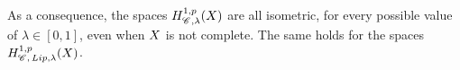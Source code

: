 \documentclass[12pt]{amsart}
\newcommand{\R}{\mathbb{R}}
\newcommand{\restr}[1]{\lower3pt\hbox{$|_{#1}$}}
\newcommand{\X}{{\rm X}}
\newcommand{\Lip}{{\rm Lip}}
\theoremstyle{definition}
\newcommand{\sfc}{{\sf c}}
\newcommand{\Chain}[1]{\mathscr{C}^{#1}}
\newcommand{\UG}[1]{{\rm UG}^{#1}}
\newcommand{\HH}[2]{H^{1,#1}_{{\rm #2}}}
\begin{document}

    As a consequence, the spaces $\HH{p}{\Chain{}, \lambda}(\X)$ are all isometric, for every possible value of $\lambda \in [0,1]$, even when $\X$ is not complete. The same holds for the spaces $\HH{p}{\Chain{},\,\Lip, \lambda}(\X)$.
%
\end{document}

